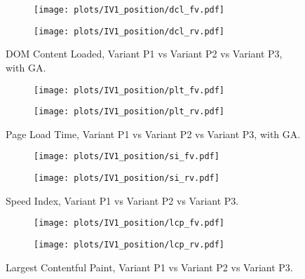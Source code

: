 \begin{figure}
	\centering
	\begin{subfigure}{.5\textwidth}
		\centering
		\texttt{[image: plots/IV1\_position/dcl\_fv.pdf]}
		\label{fig:sub1}
	\end{subfigure}%
	\begin{subfigure}{.5\textwidth}
		\centering
		\texttt{[image: plots/IV1\_position/dcl\_rv.pdf]}
		\label{fig:sub2}
	\end{subfigure}
	\caption{DOM Content Loaded, Variant P1 vs Variant P2 vs Variant P3, with GA.}
	\label{figure:plt_original_test}
\end{figure}



\begin{figure}
	\centering
	\begin{subfigure}{.5\textwidth}
		\centering
		\texttt{[image: plots/IV1\_position/plt\_fv.pdf]}
		\label{fig:sub1}
	\end{subfigure}%
	\begin{subfigure}{.5\textwidth}
		\centering
		\texttt{[image: plots/IV1\_position/plt\_rv.pdf]}
		\label{fig:sub2}
	\end{subfigure}
	\caption{Page Load Time, Variant P1 vs Variant P2 vs Variant P3, with GA.}
	\label{figure:plt_original_test}
\end{figure}

\clearpage

\begin{figure}
	\centering
	\begin{subfigure}{.5\textwidth}
		\centering
		\texttt{[image: plots/IV1\_position/si\_fv.pdf]}
		\label{fig:sub1}
	\end{subfigure}%
	\begin{subfigure}{.5\textwidth}
		\centering
		\texttt{[image: plots/IV1\_position/si\_rv.pdf]}
		\label{fig:sub2}
	\end{subfigure}
	\caption{Speed Index, Variant P1 vs Variant P2 vs Variant P3.}
	\label{figure:plt_original_test}
\end{figure}


\begin{figure}
	\centering
	\begin{subfigure}{.5\textwidth}
		\centering
		\texttt{[image: plots/IV1\_position/lcp\_fv.pdf]}
		\label{fig:sub1}
	\end{subfigure}%
	\begin{subfigure}{.5\textwidth}
		\centering
		\texttt{[image: plots/IV1\_position/lcp\_rv.pdf]}
		\label{fig:sub2}
	\end{subfigure}
	\caption{Largest Contentful Paint, Variant P1 vs Variant P2 vs Variant P3.}
	\label{figure:plt_original_test}
\end{figure}






